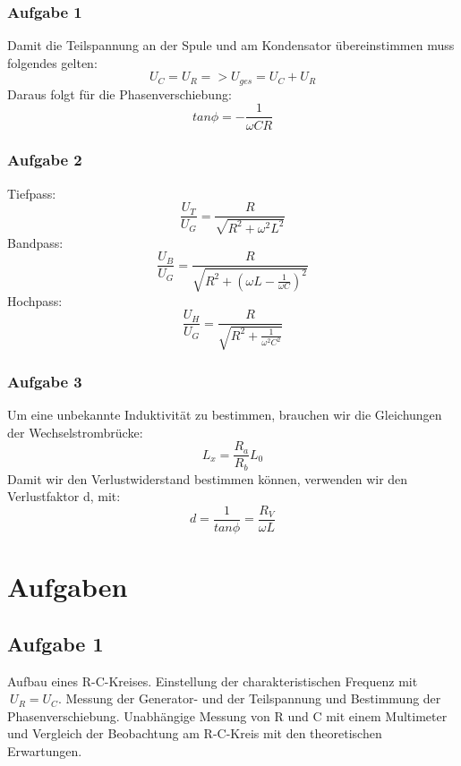 \documentclass{article}
\begin{document}
\subsubsection{Aufgabe 1}
Damit die Teilspannung an der Spule und am Kondensator übereinstimmen muss folgendes gelten:
\begin{equation}
U_C = U_R 	=>	 U_{ges} = U_C + U_R
\end{equation}
Daraus folgt für die Phasenverschiebung:
\begin{equation}
\label{ph}
tan\phi = -{\frac{1}{\omega C R}}
\end{equation}

\subsubsection{Aufgabe 2}
Tiefpass:
\begin{equation}
{\frac{U_T}{U_G}} = {\frac{R}{{\sqrt{R^2+{\omega}^2 L^2}}}}
\end{equation}
Bandpass:
\begin{equation}
{\frac{U_B}{U_G}} = {\frac{R}{{\sqrt{R^2+(\omega L - {\frac{1}{\omega C}})^2}}}}
\end{equation}
Hochpass:
\begin{equation}
{\frac{U_H}{U_G}} = {\frac{R}{{\sqrt{R^2+{\frac{1}{{\omega}^2 C^2}}}}}}
\end{equation}

\subsubsection{Aufgabe 3}
Um eine unbekannte Induktivität zu bestimmen, brauchen wir die Gleichungen der Wechselstrombrücke:
\begin{equation}
\label{L}
L_x = {\frac{R_a}{R_b}} L_0
\end{equation}
Damit wir den Verlustwiderstand bestimmen können, verwenden wir den Verlustfaktor d, mit:
\begin{equation}
\label{d}
d = {\frac{1}{tan\phi}} = {\frac{R_V}{\omega L}}
\end{equation}

\newpage

\section{Aufgaben}
\subsection{Aufgabe 1}
Aufbau eines R-C-Kreises. Einstellung der charakteristischen Frequenz mit \(\ U_{R}=U_{C} \). Messung der Generator- und der Teilspannung und Bestimmung der Phasenverschiebung. Unabhängige Messung von R und C mit einem Multimeter und Vergleich der Beobachtung am R-C-Kreis mit den theoretischen Erwartungen. 
\end{document}
